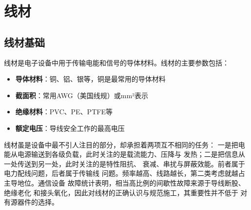
\chapter{线材}
\label{chap:wiring_materials}

\section{线材基础}
\label{sec:wiring_fundamentals}

线材是电子设备中用于传输电能和信号的导体材料。线材的主要参数包括：

\begin{itemize}
    \item \textbf{导体材料}：铜、铝、银等，铜是最常用的导体材料
    \item \textbf{截面积}：常用AWG（美国线规）或mm²表示
    \item \textbf{绝缘材料}：PVC、PE、PTFE等
    \item \textbf{额定电压}：导线安全工作的最高电压
\end{itemize}

线材虽是设备中最不引人注目的部分，却承担着两项互不相同的任务：
一是把电能从电源输送到各级负载，此时关注的是载流能力、压降与
发热；二是把信息从一处传送到另一处，此时关注的是特性阻抗、
衰减、串扰与屏蔽效能。前者属于电力配线问题，后者属于传输线
问题。频率越高、线路越长，第二类考虑就越占主导地位。通信设备
故障统计表明，相当高比例的间歇性故障来源于导线断股、绝缘老化
和接头氧化，因此对线材的正确认识与规范施工，其重要性并不低于
对有源器件的选择。


